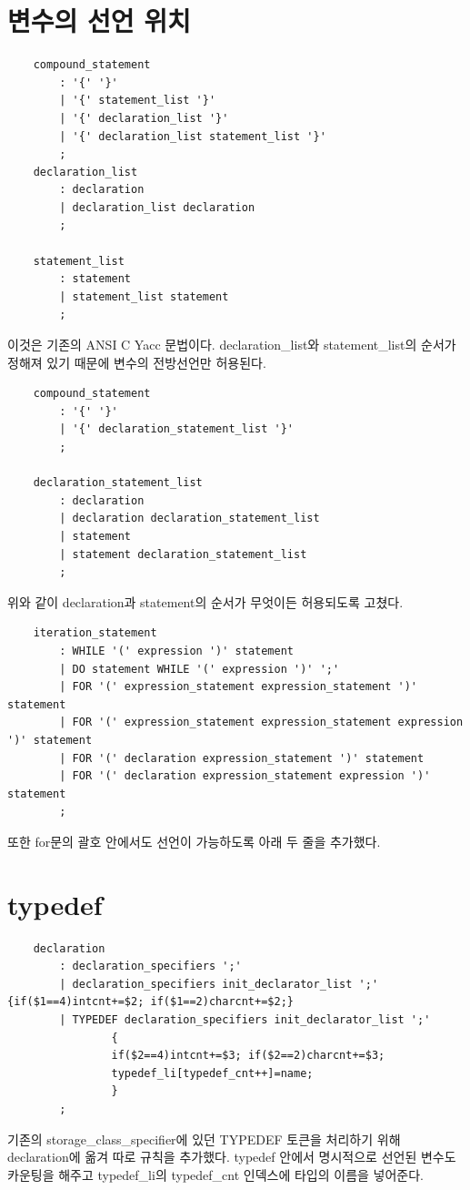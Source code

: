 \documentclass{oblivoir}
\begin{document}
\section{변수의 선언 위치}
\begin{verbatim}
    compound_statement
    	: '{' '}'
    	| '{' statement_list '}'
    	| '{' declaration_list '}'
    	| '{' declaration_list statement_list '}'
    	;
    declaration_list
    	: declaration
    	| declaration_list declaration
    	;
    
    statement_list
    	: statement
    	| statement_list statement
    	;
\end{verbatim}
이것은 기존의 ANSI C Yacc 문법이다. declaration\_list와 statement\_list의 순서가 정해져 있기 때문에 변수의 전방선언만 허용된다.

\begin{verbatim}
    compound_statement
        : '{' '}'
        | '{' declaration_statement_list '}'
        ;

    declaration_statement_list
        : declaration
        | declaration declaration_statement_list
        | statement
        | statement declaration_statement_list
        ;

\end{verbatim}
위와 같이 declaration과 statement의 순서가 무엇이든 허용되도록 고쳤다.

\begin{verbatim}
    iteration_statement
        : WHILE '(' expression ')' statement
        | DO statement WHILE '(' expression ')' ';'
        | FOR '(' expression_statement expression_statement ')' statement
        | FOR '(' expression_statement expression_statement expression ')' statement
        | FOR '(' declaration expression_statement ')' statement
        | FOR '(' declaration expression_statement expression ')' statement
        ;
\end{verbatim}
또한 for문의 괄호 안에서도 선언이 가능하도록 아래 두 줄을 추가했다.


\section{typedef}
\begin{verbatim}
    declaration
        : declaration_specifiers ';'
        | declaration_specifiers init_declarator_list ';' {if($1==4)intcnt+=$2; if($1==2)charcnt+=$2;}
        | TYPEDEF declaration_specifiers init_declarator_list ';'
                {
                if($2==4)intcnt+=$3; if($2==2)charcnt+=$3;
                typedef_li[typedef_cnt++]=name;
                }
        ;
\end{verbatim}
기존의 storage\_class\_specifier에 있던 TYPEDEF 토큰을 처리하기 위해 declaration에 옮겨 따로 규칙을 추가했다.
typedef 안에서 명시적으로 선언된 변수도 카운팅을 해주고 typedef\_li의 typedef\_cnt 인덱스에 타입의 이름을 넣어준다.
\end{document}
